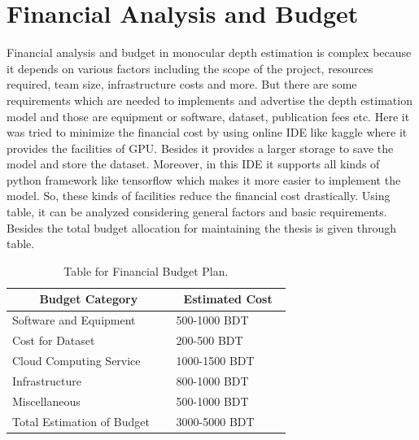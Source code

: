 \documentclass[a4paper,12pt,oneside]{book}
\begin{document}
\section{Financial Analysis and Budget }
Financial analysis and budget in monocular depth estimation is complex because it depends on various factors including the scope of the project, resources required, team size, infrastructure costs and more. But there are some requirements which are needed to implements and advertise the depth estimation model and those are equipment or software, dataset, publication fees etc. Here it was tried to minimize the financial cost by using online IDE like kaggle where it provides the facilities of GPU. Besides it provides a larger storage to save the model and store the dataset. Moreover, in this IDE it supports all kinds of python framework like tensorflow which makes it more easier to implement the model. So, these kinds of facilities reduce the financial cost drastically. Using table, it can be analyzed considering general factors and basic requirements. Besides the total budget allocation for maintaining the thesis is given through table.
\\
\begin{table}[!htb]
\centering
\begin{threeparttable}
\captionsetup{font=small}
\caption{Table for Financial Budget Plan.}
\label{tab:test}
\small %

\begin{tabular}{|p{0.40\linewidth}|p{0.28\linewidth}|}
\hline
\multicolumn{1}{|c|}{\textbf{Budget Category}} & \multicolumn{1}{c|}{\textbf{Estimated Cost}} \\  
\hline
Software and Equipment & 500-1000 BDT\\ \hline
Cost for Dataset & 200-500 BDT\\ \hline
Cloud Computing Service & 1000-1500 BDT \\ \hline
Infrastructure & 800-1000 BDT \\ \hline
Miscellaneous & 500-1000 BDT \\ \hline
Total Estimation of Budget & 3000-5000 BDT \\ \hline
\end{tabular}

\end{threeparttable}
\end{table}
\end{document}
